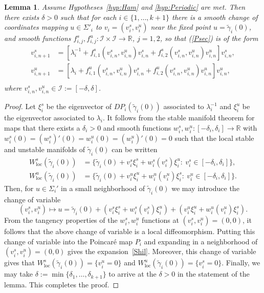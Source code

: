 \documentclass[11pt]{article}
\numberwithin{equation}{section}
\theoremstyle{plain}
\newtheorem{lem}[theorem]{Lemma}
\begin{document}
\begin{lem}\label{lem:Shil} %
Assume Hypotheses~\ref{hyp:Ham} and \ref{hyp:Periodic} are met. Then there exists $\delta > 0$ such that for each ${i \in \{1,\dots,k+1\}}$ there is a smooth change of coordinates mapping $u\in\Sigma'_i$ to $v_i = (v^s_i,v^u_i)$ near the fixed point $u = \tilde\gamma_i(0)$, and smooth functions $f^s_{i,j},f^u_{i,j}:\mathcal{I}\times\mathcal{I}\to \mathbb{R}$, $j = 1,2$, so that (\ref{Psec}) is of the form 
	\begin{equation}\label{Shil}
		\begin{split}
			v^s_{i,n+1} &= [\lambda_i^{-1} + f_{i,1}^s(v^s_{i,n},v^u_{i,n})v^s_{i,n} + f_{i,2}^s(v^s_{i,n},v^u_{i,n})v^u_{i,n}]v^s_{i,n}, \\
			v^u_{i,n+1} &= [\lambda_i + f_{i,1}^u(v^s_{i,n},v^u_{i,n})v^s_{i,n} + f_{i,2}^u(v^s_{i,n},v^u_{i,n})v^u_{i,n}]v^u_{i,n}, \\
		\end{split}
	\end{equation}	
	where $v^s_{i,n},v^u_{i,n} \in \mathcal{I} := [-\delta,\delta]$.
\end{lem}

\begin{proof}
Let $\xi^s_i$ be the eigenvector of $DP_i(\tilde\gamma_i(0))$ associated to $\lambda_i^{-1}$ and $\xi^u_i$ be the eigenvector associated to $\lambda_i$. It follows from the stable manifold theorem for maps that there exists a $\delta_i > 0$ and smooth functions $w^s_i,w^u_i:[-\delta_i,\delta_i] \to \mathbb{R}$ with $w^s_i(0) = (w^s_i)'(0) = w^u_i(0) = (w^u_i)'(0) = 0$ such that the local stable and unstable manifolds of $\tilde\gamma_i(0)$ can be written 
\begin{equation}
	\begin{split}
		W^s_\mathrm{loc}(\tilde\gamma_i(0)) &= \{\tilde\gamma_i(0) + v^s_i\xi^s_i + w^s_i(v^s_i)\xi^u_i:\ v^s_i \in [-\delta_i,\delta_i]\}, \\
		W^u_\mathrm{loc}(\tilde\gamma_i(0)) &= \{\tilde\gamma_i(0) + v^u_i\xi^u_i + w^u_i(v^u_i)\xi^s_i:\ v^u_i \in [-\delta_i,\delta_i]\}.
	\end{split}
\end{equation}
Then, for $u\in\Sigma_i'$ in a small neighborhood of $\tilde\gamma_i(0)$ we may introduce the change of variable
\begin{equation}
	(v^s_i,v^u_i) \mapsto u = \tilde\gamma_i(0) + (v^s_i\xi^s_i + w^s_i(v^s_i)\xi^u_i) + (v^u_i\xi^u_i + w^u_i(v^u_i)\xi^s_i). 
\end{equation}
From the tangency properties of the $w^s_i,w^u_i$ functions at $(v^s_i,v^u_i) = (0,0)$, it follows that the above change of variable is a local diffeomorphism. Putting this change of variable into the Poincar\'e map $P_i$ and expanding in a neighborhood of $(v^s_i,v^u_i) = (0,0)$ gives the expansion~\eqref{Shil}. Moreover, this change of variable gives that $W^s_\mathrm{loc}(\tilde\gamma_i(0)) = \{v^u_i = 0\}$ and $W^u_\mathrm{loc}(\tilde\gamma_i(0)) = \{v^s_i = 0\}$. Finally, we may take $\delta := \min \{\delta_1,\dots,\delta_{k+1}\}$ to arrive at the $\delta > 0$ in the statement of the lemma. This completes the proof.
\end{proof} %
\end{document}
